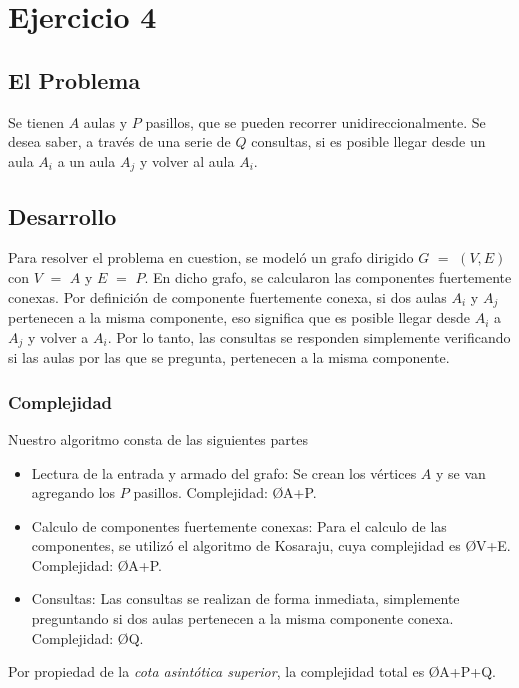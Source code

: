 \section{Ejercicio 4}
\subsection{El Problema}
Se tienen $A$ aulas y $P$ pasillos, que se pueden recorrer unidireccionalmente. Se desea saber, a través de una serie de $Q$ consultas, si es posible llegar desde un aula $A_{i}$ a un aula $A_{j}$ y volver al aula $A_{i}$.

\subsection{Desarrollo}
Para resolver el problema en cuestion, se modeló un grafo dirigido $G$ $=$ $(V,E)$ con $V$ $=$ $A$ y $E$ $=$ $P$.
En dicho grafo, se calcularon las componentes fuertemente conexas.
Por definición de componente fuertemente conexa, si dos aulas $A_{i}$ y $A_{j}$ pertenecen a la misma componente, eso significa que es posible llegar desde $A_{i}$ a $A_{j}$ y volver a $A_{i}$\textsuperscript{\cite{cfc}}.
Por lo tanto, las consultas se responden simplemente verificando si las aulas por las que se pregunta, pertenecen a la misma componente.

\subsubsection{Complejidad}
Nuestro algoritmo consta de las siguientes partes
\begin{itemize}
	\item Lectura de la entrada y armado del grafo: Se crean los vértices $A$ y se van agregando los $P$ pasillos. Complejidad: \O{A+P}.
	\item Calculo de componentes fuertemente conexas: Para el calculo de las componentes, se utilizó el algoritmo de Kosaraju, cuya complejidad es \O{V+E}\textsuperscript{\cite{cormen}}. Complejidad: \O{A+P}.
	\item Consultas: Las consultas se realizan de forma inmediata, simplemente preguntando si dos aulas pertenecen a la misma componente conexa. Complejidad: \O{Q}.
\end{itemize}

Por propiedad de la \emph{cota asintótica superior}, la complejidad total es \O{A+P+Q}.